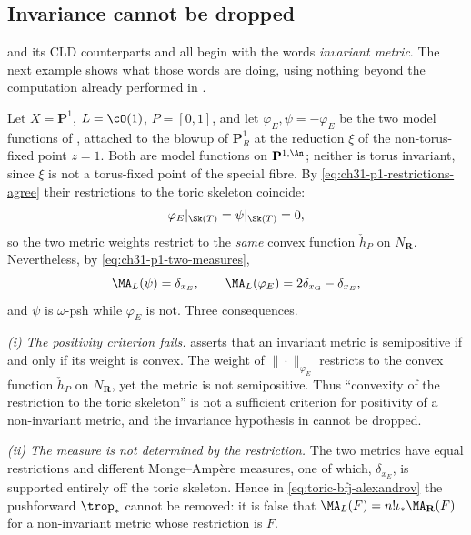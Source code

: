 \subsection{Invariance cannot be dropped}
\label{sec:ch31-toric-invariance}

 and its CLD counterparts
 and  all begin with the
words \emph{invariant metric}.  The next example shows what those words are
doing, using nothing beyond the computation already performed in
.

\begin{example}
\label{ex:ch31-noninvariant}
Let \(X=\mathbf P^1\), \(L=\cO(1)\), \(P=[0,1]\), and let
\(\varphi_E,\psi=-\varphi_E\) be the two model functions of
, attached to the blowup of \(\mathbf P^1_R\) at the
reduction \(\xi\) of the non-torus-fixed point \(z=1\).  Both are model
functions on \(\mathbf P^{1,\An}\); neither is torus invariant, since
\(\xi\) is not a torus-fixed point of the special fibre.  By
\eqref{eq:ch31-p1-restrictions-agree} their restrictions to the toric
skeleton coincide:
\[
 \varphi_E|_{\Sk(T)}=\psi|_{\Sk(T)}=0,
\]
so the two metric weights restrict to the \emph{same} convex function
\(\check h_P\) on \(N_\mathbf R\).  Nevertheless, by
\eqref{eq:ch31-p1-two-measures},
\[
 \MA_L(\psi)=\delta_{x_E},
 \qquad
 \MA_L(\varphi_E)=2\delta_{x_{\mathrm G}}-\delta_{x_E},
\]
and \(\psi\) is \(\omega\)-psh while \(\varphi_E\) is not.  Three
consequences.

\emph{(i) The positivity criterion fails.}
 asserts that an invariant metric is
semipositive if and only if its weight is convex.  The weight of
\(\|\cdot\|_{\varphi_E}\) restricts to the convex function
\(\check h_P\) on \(N_\mathbf R\), yet the metric is not semipositive.  Thus
``convexity of the restriction to the toric skeleton'' is not a sufficient
criterion for positivity of a non-invariant metric, and the invariance
hypothesis in  cannot be dropped.

\emph{(ii) The measure is not determined by the restriction.}  The two
metrics have equal restrictions and different Monge--Amp\`ere measures, one
of which, \(\delta_{x_E}\), is supported entirely off the toric skeleton.
Hence in \eqref{eq:toric-bfj-alexandrov} the pushforward \(\trop_*\) cannot
be removed: it is false that \(\MA_L(F)=n!\iota_*\MA_{\mathbf R}(F)\) for a
non-invariant metric whose restriction is \(F\).


\end{example}
